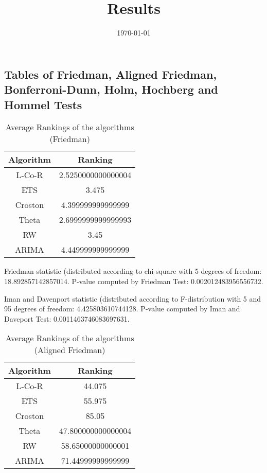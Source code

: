 \documentclass[a4paper,10pt]{article}
\title{Results}
\author{}
\date{\today}
\begin{document}
\begin{landscape}
\oddsidemargin 0in \topmargin 0in\maketitle
\section{Tables of Friedman, Aligned Friedman, Bonferroni-Dunn, Holm, Hochberg and Hommel Tests}
\begin{table}[!htp]
\centering
\caption{Average Rankings of the algorithms (Friedman)
}\begin{tabular}{c|c}
Algorithm&Ranking\\
\hline
L-Co-R&2.5250000000000004\\
ETS&3.475\\
Croston&4.399999999999999\\
Theta&2.6999999999999993\\
RW&3.45\\
ARIMA&4.449999999999999\\
\end{tabular}
\end{table}


Friedman statistic (distributed according to chi-square with 5 degrees of freedom: 18.892857142857014. 
P-value computed by Friedman Test: 0.002012483956556732.\newline

Iman and Davenport statistic (distributed according to F-distribution with 5 and 95 degrees of freedom: 4.425803610744128. 
P-value computed by Iman and Daveport Test: 0.0011463746083697631.\newline


\newpage

\begin{table}[!htp]
\centering
\caption{Average Rankings of the algorithms (Aligned Friedman)
}\begin{tabular}{c|c}
Algorithm&Ranking\\
\hline
L-Co-R&44.075\\
ETS&55.975\\
Croston&85.05\\
Theta&47.800000000000004\\
RW&58.65000000000001\\
ARIMA&71.44999999999999\\
\end{tabular}
\end{table}



\end{landscape}
\end{document}
